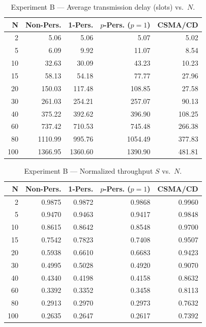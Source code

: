 \documentclass[11pt]{article}
\begin{document}
\begin{table}[H]
\centering
\small
\begin{tabular}{rrrrr}
\toprule
\textbf{N} & \textbf{Non-Pers.} & \textbf{1-Pers.} & \textbf{$p$-Pers. ($p{=}1$)} & \textbf{CSMA/CD} \\
\midrule
2   & 5.06    & 5.06    & 5.07    & 5.02 \\
5   & 6.09    & 9.92    & 11.07   & 8.54 \\
10  & 32.63   & 30.09   & 43.23   & 10.23 \\
15  & 58.13   & 54.18   & 77.77   & 27.96 \\
20  & 150.03  & 117.48  & 108.85  & 27.58 \\
30  & 261.03  & 254.21  & 257.07  & 90.13 \\
40  & 375.22  & 392.62  & 396.90  & 108.25 \\
60  & 737.42  & 710.53  & 745.48  & 266.38 \\
80  & 1110.99 & 995.76  & 1054.49 & 377.83 \\
100 & 1366.95 & 1360.60 & 1390.90 & 481.81 \\
\bottomrule
\end{tabular}
\caption{Experiment B --- Average transmission delay (slots) vs.\ $N$.}
\end{table}

\begin{table}[H]
\centering
\small
\begin{tabular}{rrrrr}
\toprule
\textbf{N} & \textbf{Non-Pers.} & \textbf{1-Pers.} & \textbf{$p$-Pers. ($p{=}1$)} & \textbf{CSMA/CD} \\
\midrule
2   & 0.9875 & 0.9872 & 0.9868 & 0.9960 \\
5   & 0.9470 & 0.9463 & 0.9417 & 0.9848 \\
10  & 0.8615 & 0.8642 & 0.8548 & 0.9700 \\
15  & 0.7542 & 0.7823 & 0.7408 & 0.9507 \\
20  & 0.5938 & 0.6610 & 0.6683 & 0.9423 \\
30  & 0.4995 & 0.5028 & 0.4920 & 0.9070 \\
40  & 0.4340 & 0.4198 & 0.4158 & 0.8632 \\
60  & 0.3392 & 0.3352 & 0.3458 & 0.8113 \\
80  & 0.2913 & 0.2970 & 0.2973 & 0.7632 \\
100 & 0.2635 & 0.2647 & 0.2617 & 0.7392 \\
\bottomrule
\end{tabular}
\caption{Experiment B --- Normalized throughput $S$ vs.\ $N$.}
\label{tab:throughputN}
\end{table}
\end{document}
